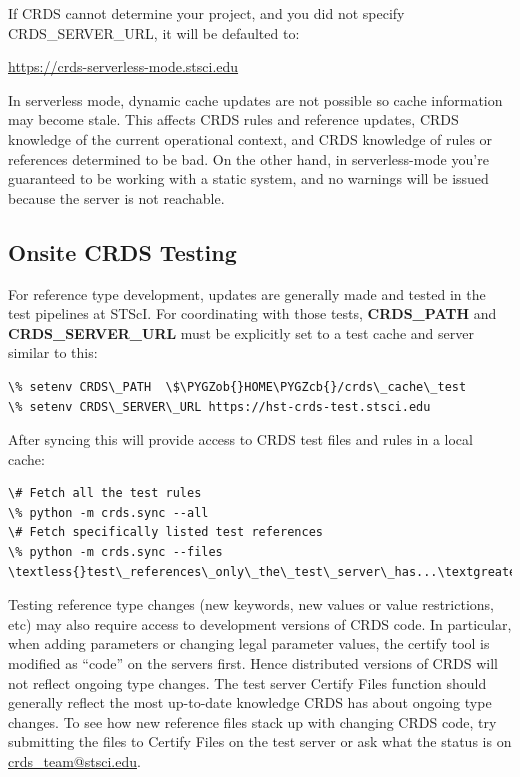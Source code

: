 \documentclass[letterpaper,10pt,english]{sphinxmanual}
\def\PYGZob{\char`\{}
\def\PYGZcb{\char`\}}
\begin{document}
If CRDS cannot determine your project,  and you did not specify CRDS\_SERVER\_URL,  it will be defaulted to:

\href{https://crds-serverless-mode.stsci.edu}{https://crds-serverless-mode.stsci.edu}

In serverless mode, dynamic cache updates are not possible so cache information may become stale.  This affects CRDS
rules and reference updates,  CRDS knowledge of the current operational context, and CRDS knowledge of rules or
references determined to be bad.   On the other hand,  in serverless-mode you're guaranteed to be working with
a static system, and no warnings will  be issued because the server is not reachable.


\subsection{Onsite CRDS Testing}
\label{installation:onsite-crds-testing}
For reference type development,  updates are generally made and tested in the test pipelines at STScI.  For
coordinating with those tests,  \textbf{CRDS\_PATH} and \textbf{CRDS\_SERVER\_URL} must be explicitly set to a test cache and server
similar to this:

\begin{Verbatim}[commandchars=\\\{\}]
\% setenv CRDS\_PATH  \$\PYGZob{}HOME\PYGZcb{}/crds\_cache\_test
\% setenv CRDS\_SERVER\_URL https://hst-crds-test.stsci.edu
\end{Verbatim}

After syncing this will provide access to CRDS test files and rules in a local cache:

\begin{Verbatim}[commandchars=\\\{\}]
\# Fetch all the test rules
\% python -m crds.sync --all
\# Fetch specifically listed test references
\% python -m crds.sync --files \textless{}test\_references\_only\_the\_test\_server\_has...\textgreater{}
\end{Verbatim}

Testing reference type changes (new keywords,  new values or value restrictions, etc) may also require access to
development versions of CRDS code.   In particular,  when adding parameters or changing legal parameter values,
the certify tool is modified as ``code'' on the servers first.   Hence distributed versions of CRDS will not reflect
ongoing type changes.   The test server Certify Files function should generally reflect the most up-to-date knowledge
CRDS has about ongoing type changes.  To see how new reference files stack up with changing CRDS code,  try submitting
the files to Certify Files on the test server or ask what the status is on \href{mailto:crds\_team@stsci.edu}{crds\_team@stsci.edu}.
\end{document}
